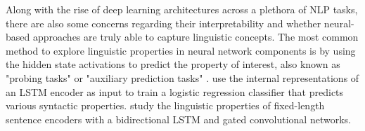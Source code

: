 \documentclass[11pt]{article}
\begin{document}





Along with the rise of deep learning architectures across a plethora of NLP tasks, there are also some concerns regarding their interpretability and whether neural-based approaches are truly able to capture linguistic concepts. The most common method to explore linguistic properties in neural network components is by using the hidden state activations to predict the property of interest, also known as "probing tasks" \parencite{conneau-etal-2018-cram} or "auxiliary prediction tasks" \parencite{auxilliarypredictiontasks}. \textcite{shi2016string} use the internal representations of an LSTM encoder as input to train a logistic regression classifier that predicts various syntactic properties. \textcite{conneau-etal-2018-cram} study the linguistic properties of fixed-length sentence encoders with a bidirectional LSTM and gated convolutional networks.
\end{document}
